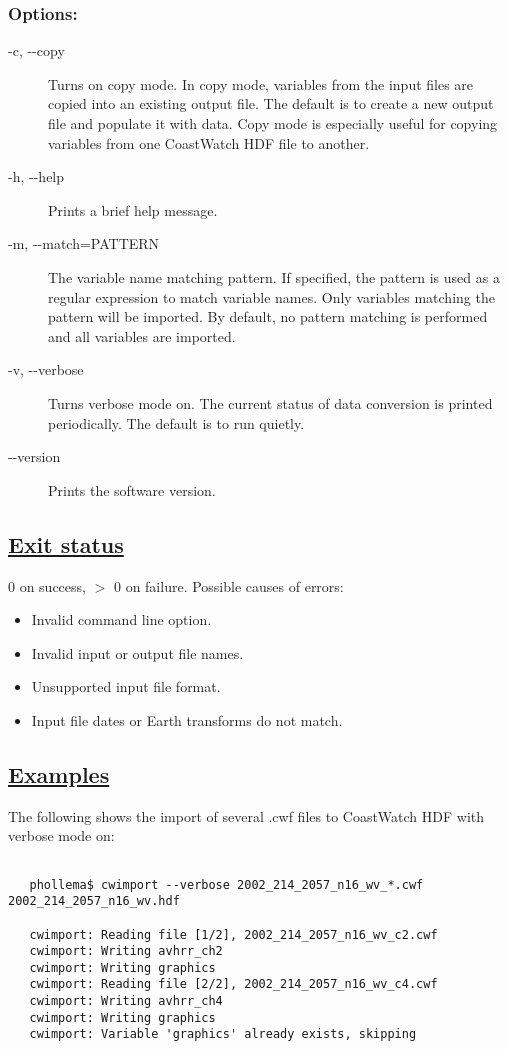 \subsubsection*{Options:}
\begin{description}
\item[ -c, -{-}copy ] Turns on copy mode. In copy mode, variables from the input files are copied into an existing output file. The default is to create a new output file and populate it with data. Copy mode is especially useful for copying variables from one CoastWatch HDF file to another.
\item[ -h, -{-}help ] Prints a brief help message. 
\item[ -m, -{-}match=PATTERN ] The variable name matching pattern. If specified, the pattern is used as a regular expression to match variable names. Only variables matching the pattern will be imported. By default, no pattern matching is performed and all variables are imported. 
\item[ -v, -{-}verbose ] Turns verbose mode on. The current status of data conversion is printed periodically. The default is to run quietly. 
\item[-{-}version]Prints the software version.

\end{description}
\subsection*{\underline{Exit status}}


  0 on success, $>$ 0 on failure. Possible causes of errors:
\begin{itemize}
\item  Invalid command line option. 
\item  Invalid input or output file names. 
\item  Unsupported input file format. 
\item  Input file dates or Earth transforms do not match. 

\end{itemize}
\subsection*{\underline{Examples}}


  The following shows the import of several .cwf files to CoastWatch HDF with verbose mode on:
\begin{verbatim}

   phollema$ cwimport --verbose 2002_214_2057_n16_wv_*.cwf 2002_214_2057_n16_wv.hdf

   cwimport: Reading file [1/2], 2002_214_2057_n16_wv_c2.cwf
   cwimport: Writing avhrr_ch2
   cwimport: Writing graphics
   cwimport: Reading file [2/2], 2002_214_2057_n16_wv_c4.cwf
   cwimport: Writing avhrr_ch4
   cwimport: Writing graphics
   cwimport: Variable 'graphics' already exists, skipping
 
\end{verbatim}

